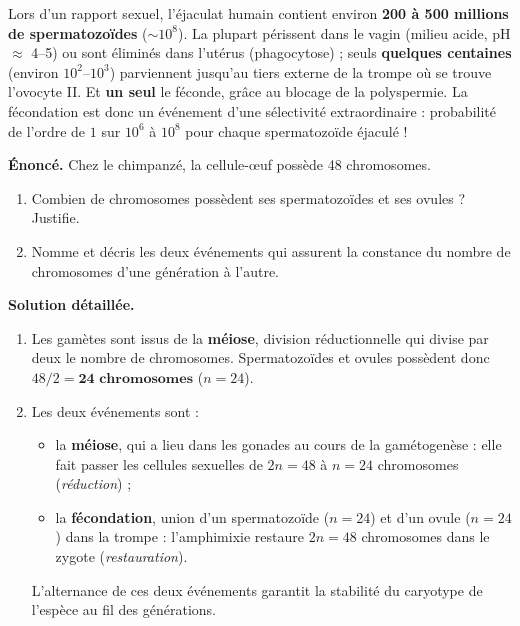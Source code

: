 \documentclass[11pt]{article}
\begin{document}
\begin{exemplebox}
Lors d'un rapport sexuel, l'éjaculat humain contient environ \textbf{200 à 500 millions de spermatozoïdes} ($\sim 10^8$). La plupart périssent dans le vagin (milieu acide, pH $\approx$ 4--5) ou sont éliminés dans l'utérus (phagocytose) ; seuls \textbf{quelques centaines} (environ $10^2$--$10^3$) parviennent jusqu'au tiers externe de la trompe où se trouve l'ovocyte II. Et \textbf{un seul} le féconde, grâce au blocage de la polyspermie. La fécondation est donc un événement d'une sélectivité extraordinaire : probabilité de l'ordre de $1$ sur $10^6$ à $10^8$ pour chaque spermatozoïde éjaculé !
\end{exemplebox}

\begin{exoresolu}
\textbf{Énoncé.} Chez le chimpanzé, la cellule-œuf possède 48 chromosomes.
\begin{enumerate}
\item Combien de chromosomes possèdent ses spermatozoïdes et ses ovules ? Justifie.
\item Nomme et décris les deux événements qui assurent la constance du nombre de chromosomes d'une génération à l'autre.
\end{enumerate}
\tcblower
\textbf{Solution détaillée.}
\begin{enumerate}
\item Les gamètes sont issus de la \textbf{méiose}, division réductionnelle qui divise par deux le nombre de chromosomes. Spermatozoïdes et ovules possèdent donc $48 / 2 = \textbf{24 chromosomes}$ ($n = 24$).
\item Les deux événements sont :
\begin{itemize}
\item la \textbf{méiose}, qui a lieu dans les gonades au cours de la gamétogenèse : elle fait passer les cellules sexuelles de $2n = 48$ à $n = 24$ chromosomes (\emph{réduction}) ;
\item la \textbf{fécondation}, union d'un spermatozoïde ($n = 24$) et d'un ovule ($n = 24$) dans la trompe : l'amphimixie restaure $2n = 48$ chromosomes dans le zygote (\emph{restauration}).
\end{itemize}
L'alternance de ces deux événements garantit la stabilité du caryotype de l'espèce au fil des générations.
\end{enumerate}
\end{exoresolu}
\end{document}
